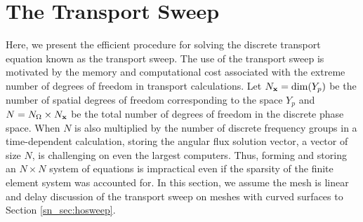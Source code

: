\documentclass[../doc.tex]{subfiles}
\begin{document}
\section{The Transport Sweep} \label{sn_sec:sweep}
Here, we present the efficient procedure for solving the discrete transport equation known as the transport sweep. The use of the transport sweep is motivated by the memory and computational cost associated with the extreme number of degrees of freedom in transport calculations. Let $N_{\boldsymbol{\mathrm{x}}} = \dim(Y_p)$ be the number of spatial degrees of freedom corresponding to the space $Y_p$ and $N = N_\Omega \times N_{\boldsymbol{\mathrm{x}}}$ be the total number of degrees of freedom in the discrete phase space. When $N$ is also multiplied by the number of discrete frequency groups in a time-dependent calculation, storing the angular flux solution vector, a vector of size $N$, is challenging on even the largest computers. Thus, forming and storing an $N\times N$ system of equations is impractical even if the sparsity of the finite element system was accounted for. In this section, we assume the mesh is linear and delay discussion of the transport sweep on meshes with curved surfaces to Section \ref{sn_sec:hosweep}. 
\end{document}
